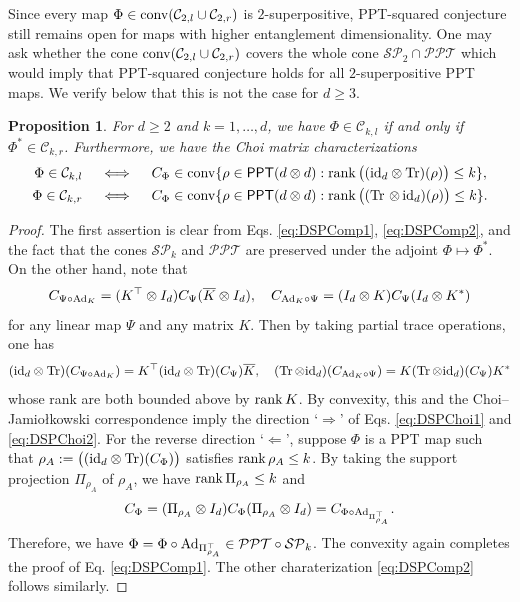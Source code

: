 \documentclass[11pt,reqno]{amsart}
\newtheorem{proposition}[theorem]{Proposition}
\theoremstyle{definition}
\theoremstyle{definition}
\theoremstyle{definition}
\theoremstyle{definition}
\newcommand{\id}{\mathrm{id}}
\newcommand{\ppt}{\mathsf{PPT}}
\newcommand{\SP}{\mathcal{SP}}
\newcommand{\PPT}{\mathcal{PPT}}
\newcommand{\Ad}{{\rm Ad}}
\begin{document}
Since every map $\Phi\in {\rm conv}(\mathcal{C}_{2,l}\cup \mathcal{C}_{2,r})$ is $2$-superpositive, PPT-squared conjecture still remains open for maps with higher entanglement dimensionality. One may ask whether the cone ${\rm conv}(\mathcal{C}_{2,l}\cup \mathcal{C}_{2,r})$ covers the whole cone $\SP_2\cap \PPT$ which would imply that PPT-squared conjecture holds for all $2$-superpositive PPT maps. We verify below that this is not the case for $d\geq 3$. 

\begin{proposition} \label{prop:DSPChoi}
For $d\geq 2$ and $k=1,\ldots, d$, we have $\Phi\in \mathcal{C}_{k,l}$ if and only if $\Phi^*\in \mathcal{C}_{k,r}$. Furthermore, we have the Choi matrix characterizations
\begin{align} 
    \Phi \in \mathcal{C}_{k,l} \quad &\iff \quad C_{\Phi}\in {\rm conv}\{\rho\in \ppt(d\otimes d): \rank \big((\id_d\otimes \Tr)(\rho)\big)\leq k\}, \label{eq:DSPChoi1}\\
    \Phi \in \mathcal{C}_{k,r} \quad &\iff \quad C_{\Phi}\in {\rm conv}\{\rho\in \ppt(d\otimes d): \rank \big((\Tr\,\otimes\, \id_d)(\rho)\big) \leq k\}. \label{eq:DSPChoi2}
\end{align}
\end{proposition}
\begin{proof}
The first assertion is clear from Eqs. \eqref{eq:DSPComp1}, \eqref{eq:DSPComp2}, and the fact that the cones $\SP_k$ and $\PPT$ are preserved under the adjoint $\Phi\mapsto \Phi^*$. On the other hand, note that
    $$C_{\Psi\circ \Ad_K} = (K^{\top}\otimes I_d)C_{\Psi}(\overline{K}\otimes I_d), \quad C_{\Ad_K\circ \Psi} = (I_d\otimes K)C_{\Psi}(I_d\otimes K^*)$$
for any linear map $\Psi$ and any matrix $K$. Then by taking partial trace operations, one has
\begin{align*}
    (\id_d\otimes \Tr)(C_{\Psi\circ \Ad_K}) = K^{\top}(\id_d\otimes \Tr)(C_{\Psi})\overline{K}, \quad (\Tr\otimes \id_d)(C_{\Ad_K\circ \Psi}) = K(\Tr\otimes \id_d)(C_{\Psi})K^*
\end{align*}
whose rank are both bounded above by $\rank K$. By convexity, this and the Choi--Jamio{\l}kowski correspondence imply the direction `$\Longrightarrow$' of Eqs. \eqref{eq:DSPChoi1} and \eqref{eq:DSPChoi2}. For the reverse direction `$\Longleftarrow$', suppose $\Phi$ is a PPT map such that $\rho_A:=\big((\id_d\otimes \Tr)(C_{\Phi})\big)$ satisfies $\rank \rho_A \leq k$. By taking the support projection $\Pi_{\rho_A}$ of $\rho_A$, we have $\rank \Pi_{\rho_A}\leq k$ and
    $$C_{\Phi} = (\Pi_{\rho_A}\otimes I_d)C_{\Phi}(\Pi_{\rho_A}\otimes I_d) = C_{\Phi\circ \Ad_{\Pi^{\top}_{\rho_A}}}.$$
Therefore, we have $\Phi = \Phi\circ \Ad_{\Pi^{\top}_{\rho_A}}\in \PPT \circ \SP_k$. The convexity again completes the proof of Eq. \eqref{eq:DSPComp1}. The other charaterization \eqref{eq:DSPComp2} follows similarly.
\end{proof}
\end{document}
